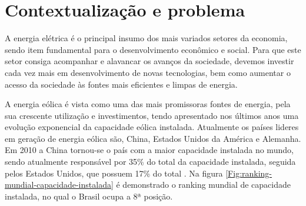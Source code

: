 
\label{Cap:fundamentacao}

\section{Contextualização e problema}
\label{contextualização}









A energia elétrica é o principal insumo dos mais variados setores da economia, sendo item fundamental para o desenvolvimento econômico e social. Para que este setor consiga acompanhar e alavancar os avanços da sociedade, devemos investir cada vez mais em desenvolvimento de novas tecnologias, bem como aumentar o acesso da sociedade às fontes mais eficientes e limpas de energia.

A energia eólica é vista como uma das mais promissoras fontes de energia, pela sua crescente utilização e investimentos, tendo apresentado nos últimos anos uma evolução exponencial da capacidade eólica instalada. Atualmente os países lideres em geração de energia eólica são, China, Estados Unidos da América e Alemanha. Em 2010 a China tornou-se o país com a maior capacidade instalada no mundo, sendo atualmente responsável por 35\% do total da capacidade instalada, seguida pelos Estados Unidos, que possuem 17\% do total \cite{global-wind-energy}. Na figura \ref{Fig:ranking-mundial-capacidade-instalada} é demonstrado o ranking mundial de capacidade instalada, no qual o Brasil ocupa a 8ª posição.

